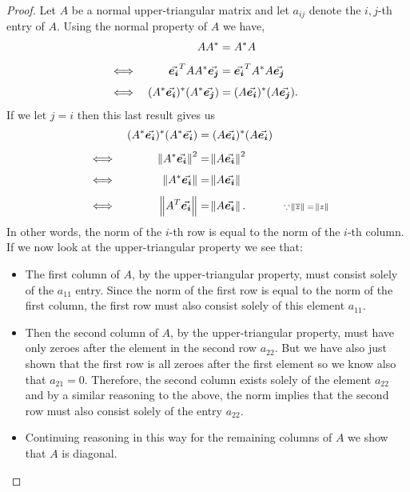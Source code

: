 \documentclass[../MathsNotesBase.tex]{subfiles}
\begin{document}
{		\bigskip
		\begin{proof}
			Let $A$ be a normal upper-triangular matrix and let $a_{ij}$ denote the $i,j$-th entry of $A$. Using the normal property of $A$ we have,
			\[\begin{aligned}
				&& A A^* &= A^* A \\[4pt]
				&\iff & \vec{\bm{e_i}}^T A A^* \vec{\bm{e_j}} &= \vec{\bm{e_i}}^T A^* A \vec{\bm{e_j}} &\text{\scriptsize{}} \\[4pt]
				&\iff & (A^* \vec{\bm{e_i}})^* (A^* \vec{\bm{e_j}}) &= (A \vec{\bm{e_i}})^* (A \vec{\bm{e_j}}).
			\end{aligned}\]
			If we let ${ j = i }$ then this last result gives us
			\[\begin{aligned}
				&& (A^* \vec{\bm{e_i}})^* (A^* \vec{\bm{e_i}}) &= (A \vec{\bm{e_i}})^* (A \vec{\bm{e_i}}) \\[4pt]
				&\iff & \norm{A^* \vec{\bm{e_i}}}^2 &= \norm{A \vec{\bm{e_i}}}^2 &\text{\scriptsize{}} \\[4pt]
				&\iff & \norm{A^* \vec{\bm{e_i}}} &= \norm{A \vec{\bm{e_i}}} &\text{\scriptsize{}} \\[4pt]
				&\iff & \norm{A^T \vec{\bm{e_i}}} &= \norm{A \vec{\bm{e_i}}}. &\text{\scriptsize{${ \because \norm{\overline{z}} = \norm{z} }$}}
			\end{aligned}\] 
			In other words, the norm of the $i$-th row is equal to the norm of the $i$-th column. If we now look at the upper-triangular property we see that:
			\begin{itemize}
				\item{The first column of $A$, by the upper-triangular property, must consist solely of the $a_{11}$ entry. Since the norm of the first row is equal to the norm of the first column, the first row must also consist solely of this element $a_{11}$.}
				\item{Then the second column of $A$, by the upper-triangular property, must have only zeroes after the element in the second row $a_{22}$. But we have also just shown that the first row is all zeroes after the first element so we know also that ${ a_{21} = 0 }$. Therefore, the second column exists solely of the element $a_{22}$ and by a similar reasoning to the above, the norm implies that the second row must also consist solely of the entry $a_{22}$.}
				\item{Continuing reasoning in this way for the remaining columns of $A$ we show that $A$ is diagonal.}
			\end{itemize}
		\end{proof}
	
}
\end{document}
